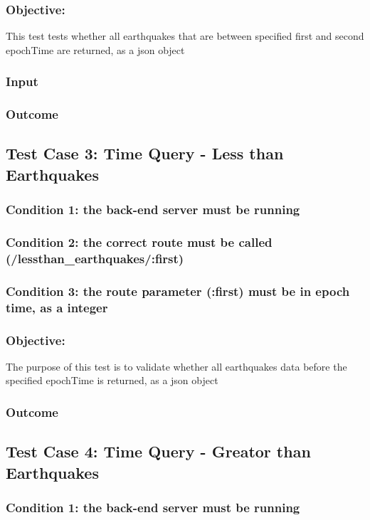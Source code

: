 \subsubsection{Objective: } This test tests whether all earthquakes that are between specified first and second epochTime are returned, as a json object
\subsubsection{Input}
\subsubsection{Outcome}


\subsection{Test Case 3: Time Query - Less than Earthquakes}
\subsubsection{Condition 1: the back-end server must be running}
\subsubsection{Condition 2: the correct route must be called (/lessthan\_earthquakes/:first)}
\subsubsection{Condition 3: the route parameter (:first) must be in epoch time, as a integer}
\subsubsection{Objective:} The purpose of this test is to validate whether all  earthquakes data before the specified epochTime is returned, as a json object
\subsubsection{Outcome}


\subsection{Test Case 4: Time Query - Greator than Earthquakes}
\subsubsection{Condition 1: the back-end server must be running}
